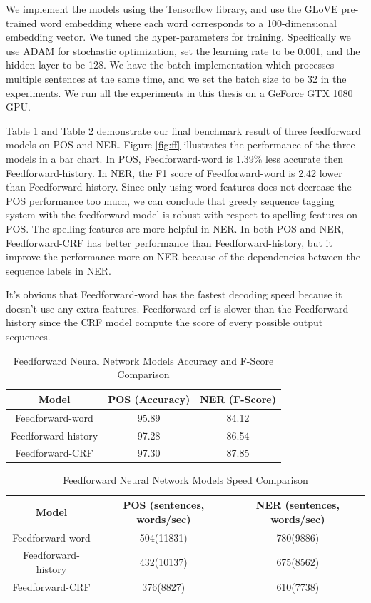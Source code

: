 \documentclass{sfuthesis}
\begin{document}
 
We implement the models using the Tensorflow library, and use the GLoVE pre-trained word embedding where each word corresponds to a 100-dimensional embedding vector. We tuned the hyper-parameters for training. Specifically we use ADAM for stochastic optimization, set the learning rate to be 0.001, and the hidden layer to be 128. We have the batch implementation which processes multiple sentences at the same time, and we set the batch size to be 32 in the experiments. We run all the experiments in this thesis on a GeForce GTX 1080 GPU. 

Table \ref{table:ff-table1} and Table \ref{table:ff-tabel2} demonstrate our final benchmark result of three feedforward models on POS and NER. Figure \ref{fig:ff} illustrates the performance of the three models in a bar chart. In POS, Feedforward-word is 1.39\% less accurate then Feedforward-history. In NER, the F1 score of Feedforward-word is 2.42 lower than Feedforward-history. Since only using word features does not decrease the POS performance too much, we can conclude that greedy sequence tagging system with the feedforward model is robust with respect to spelling features on POS. The spelling features are more helpful in NER. In both POS and NER, Feedforward-CRF has better performance than Feedforward-history, but it improve the performance more on NER because of the dependencies between the sequence labels in NER.

It's obvious that Feedforward-word has the fastest decoding speed because it doesn't use any extra features. Feedforward-crf is slower than the Feedforward-history since the CRF model compute the score of every possible output sequences.

\begin{table}[]
\centering
\caption{Feedforward Neural Network Models Accuracy and F-Score Comparison}
\label{table:ff-table1}
\begin{tabular}{|c|c|c|}
\hline
Model         & POS (Accuracy)  & NER (F-Score)       \\ \hline
Feedforward-word    & 95.89          &   84.12     \\ \hline
Feedforward-history & 97.28     & 86.54        \\ \hline
Feedforward-CRF     & 97.30          &   87.85     \\ \hline
\end{tabular}
\end{table}

\begin{table}[]
\centering
\caption{Feedforward Neural Network Models Speed Comparison}
\label{table:ff-tabel2}
\begin{tabular}{|c|c|c|}
\hline
Model       & POS  (sentences, words/sec)  & NER  (sentences, words/sec)      \\ \hline
Feedforward-word    & 504(11831)     & 780(9886)    \\ \hline
Feedforward-history & 432(10137)     & 675(8562)     \\ \hline
Feedforward-CRF    & 376(8827)     & 610(7738)     \\ \hline
\end{tabular}
\end{table}
\end{document}
